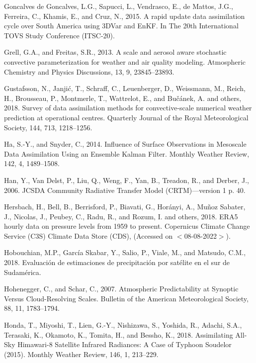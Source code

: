 \documentclass[12pt,oneside,a4paper]{reedthesis}
\begin{document}
\leavevmode\hypertarget{ref-goncalvesdegoncalves2015}{}%
Goncalves de Goncalves, L.G., Sapucci, L., Vendrasco, E., de Mattos, J.G., Ferreira, C., Khamis, E., and Cruz, N., 2015. A rapid update data assimilation cycle over South America using 3DVar and EnKF. In The 20th International TOVS Study Conference (ITSC-20).

\leavevmode\hypertarget{ref-grell2013}{}%
Grell, G.A., and Freitas, S.R., 2013. A scale and aerosol aware stochastic convective parameterization for weather and air quality modeling. Atmospheric Chemistry and Physics Discussions, 13, 9, 23845--23893.

\leavevmode\hypertarget{ref-gustafsson2018}{}%
Gustafsson, N., Janjić, T., Schraff, C., Leuenberger, D., Weissmann, M., Reich, H., Brousseau, P., Montmerle, T., Wattrelot, E., and Bučánek, A. and others, 2018. Survey of data assimilation methods for convective‐scale numerical weather prediction at operational centres. Quarterly Journal of the Royal Meteorological Society, 144, 713, 1218--1256.

\leavevmode\hypertarget{ref-ha2014}{}%
Ha, S.-Y., and Snyder, C., 2014. Influence of Surface Observations in Mesoscale Data Assimilation Using an Ensemble Kalman Filter. Monthly Weather Review, 142, 4, 1489--1508.

\leavevmode\hypertarget{ref-han2006}{}%
Han, Y., Van Delst, P., Liu, Q., Weng, F., Yan, B., Treadon, R., and Derber, J., 2006. JCSDA Community Radiative Transfer Model (CRTM)---version 1 p. 40.

\leavevmode\hypertarget{ref-era5pressure}{}%
Hersbach, H., Bell, B., Berrisford, P., Biavati, G., Horányi, A., Muñoz Sabater, J., Nicolas, J., Peubey, C., Radu, R., and Rozum, I. and others, 2018. ERA5 hourly data on pressure levels from 1959 to present. Copernicus Climate Change Service (C3S) Climate Data Store (CDS), (Accessed on \(<\)08-08-2022\(>\)).

\leavevmode\hypertarget{ref-hobouchian2018}{}%
Hobouchian, M.P., García Skabar, Y., Salio, P., Viale, M., and Matsudo, C.M., 2018. Evaluación de estimaciones de precipitación por satélite en el sur de Sudamérica.

\leavevmode\hypertarget{ref-hohenegger2007}{}%
Hohenegger, C., and Schar, C., 2007. Atmospheric Predictability at Synoptic Versus Cloud-Resolving Scales. Bulletin of the American Meteorological Society, 88, 11, 1783--1794.

\leavevmode\hypertarget{ref-honda2018}{}%
Honda, T., Miyoshi, T., Lien, G.-Y., Nishizawa, S., Yoshida, R., Adachi, S.A., Terasaki, K., Okamoto, K., Tomita, H., and Bessho, K., 2018. Assimilating All-Sky Himawari-8 Satellite Infrared Radiances: A Case of Typhoon Soudelor (2015). Monthly Weather Review, 146, 1, 213--229.
\end{document}
